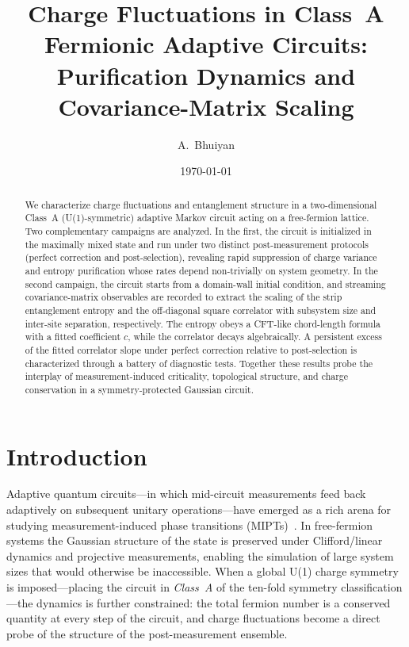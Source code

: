 \documentclass[twocolumn,aps,prx,10pt,floatfix]{revtex4-2}
\begin{document}
\title{Charge Fluctuations in Class~A Fermionic Adaptive Circuits:\\
Purification Dynamics and Covariance-Matrix Scaling}

\author{A.~Bhuiyan}
\date{\today}

\begin{abstract}
We characterize charge fluctuations and entanglement structure in a two-dimensional
Class~A (U(1)-symmetric) adaptive Markov circuit acting on a free-fermion lattice.
Two complementary campaigns are analyzed.  In the first, the circuit is initialized
in the maximally mixed state and run under two distinct post-measurement protocols
(perfect correction and post-selection), revealing rapid suppression of charge
variance and entropy purification whose rates depend non-trivially on system
geometry.  In the second campaign, the circuit starts from a domain-wall initial
condition, and streaming covariance-matrix observables are recorded to extract the
scaling of the strip entanglement entropy and the off-diagonal square correlator
with subsystem size and inter-site separation, respectively.  The entropy obeys a
CFT-like chord-length formula with a fitted coefficient $c$, while the correlator
decays algebraically.  A persistent excess of the fitted correlator slope under
perfect correction relative to post-selection is characterized through a battery of
diagnostic tests.  Together these results probe the interplay of measurement-induced
criticality, topological structure, and charge conservation in a symmetry-protected
Gaussian circuit.
\end{abstract}

\maketitle

\section{Introduction}

Adaptive quantum circuits---in which mid-circuit measurements feed back adaptively
on subsequent unitary operations---have emerged as a rich arena for studying
measurement-induced phase transitions
(MIPTs)~\cite{Nahum2017,Li2018,Skinner2019,Chan2019,Bao2020}.
In free-fermion systems the Gaussian structure of the state is preserved
under Clifford/linear dynamics and projective measurements, enabling the
simulation of large system sizes that would otherwise be inaccessible.  When
a global U(1) charge symmetry is imposed---placing the circuit in \emph{Class~A}
of the ten-fold symmetry classification---the dynamics is further constrained:
the total fermion number is a conserved quantity at every step of the circuit,
and charge fluctuations become a direct probe of the structure of the
post-measurement ensemble.
\end{document}
